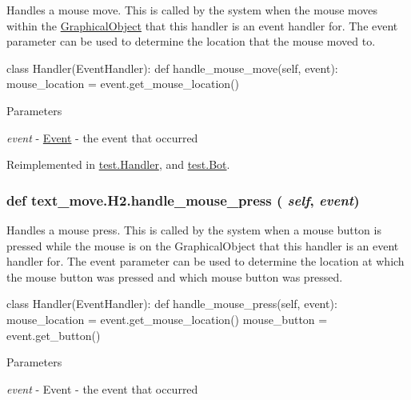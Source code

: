 Handles a mouse move. This is called by the system when the mouse moves within the \hyperlink{classcs110graphics_1_1GraphicalObject}{GraphicalObject} that this handler is an event handler for. The event parameter can be used to determine the location that the mouse moved to. 
\begin{DoxyCode}
 class Handler(EventHandler):
     def handle_mouse_move(self, event):
         mouse_location = event.get_mouse_location()
\end{DoxyCode}
 
\begin{DoxyParams}{Parameters}
\item[{\em event}]-\/ \hyperlink{classcs110graphics_1_1Event}{Event} -\/ the event that occurred \end{DoxyParams}


Reimplemented in \hyperlink{classtest_1_1Handler_a88a2d58962eb4bf7338332848fa5fc3a}{test.Handler}, and \hyperlink{classtest_1_1Bot_ad1464516fb04013fa7e353a78f0ec218}{test.Bot}.\hypertarget{classtext__move_1_1H2_a13611a7fe23eefc92b40ff3874e026bd}{
\subsubsection[{handle\_\-mouse\_\-press}]{\setlength{\rightskip}{0pt plus 5cm}def text\_\-move.H2.handle\_\-mouse\_\-press ( {\em self}, \/   {\em event})}}
\label{classtext__move_1_1H2_a13611a7fe23eefc92b40ff3874e026bd}


Handles a mouse press. This is called by the system when a mouse button is pressed while the mouse is on the GraphicalObject that this handler is an event handler for. The event parameter can be used to determine the location at which the mouse button was pressed and which mouse button was pressed. 
\begin{DoxyCode}
 class Handler(EventHandler):
     def handle_mouse_press(self, event):
         mouse_location = event.get_mouse_location()
         mouse_button = event.get_button()
\end{DoxyCode}
 
\begin{DoxyParams}{Parameters}
\item[{\em event}]-\/ Event -\/ the event that occurred \end{DoxyParams}


